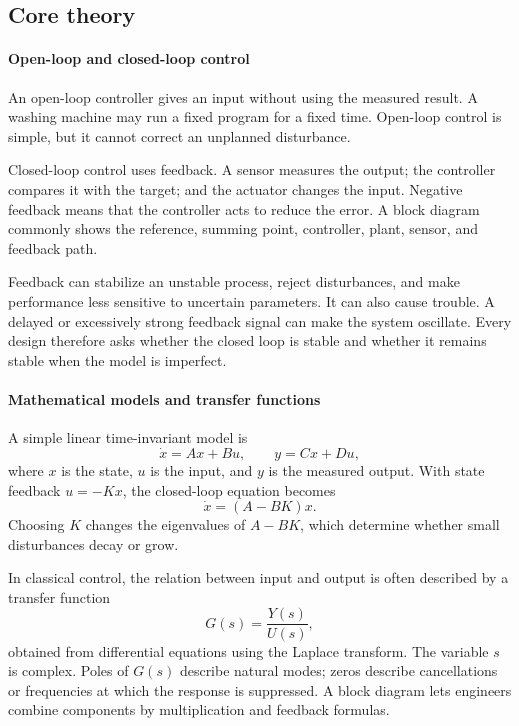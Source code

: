 \subsection*{Core theory}
\paragraph{Open-loop and closed-loop control}

An open-loop controller gives an input without using the measured result. A washing machine may run a fixed program for a fixed time. Open-loop control is simple, but it cannot correct an unplanned disturbance.

Closed-loop control uses feedback. A sensor measures the output; the controller compares it with the target; and the actuator changes the input. Negative feedback means that the controller acts to reduce the error. A block diagram commonly shows the reference, summing point, controller, plant, sensor, and feedback path.

Feedback can stabilize an unstable process, reject disturbances, and make performance less sensitive to uncertain parameters. It can also cause trouble. A delayed or excessively strong feedback signal can make the system oscillate. Every design therefore asks whether the closed loop is stable and whether it remains stable when the model is imperfect.

\paragraph{Mathematical models and transfer functions}

A simple linear time-invariant model is
\[
 \dot x=Ax+Bu,\qquad y=Cx+Du,
\]
where $x$ is the state, $u$ is the input, and $y$ is the measured output. With state feedback $u=-Kx$, the closed-loop equation becomes
\[
 \dot x=(A-BK)x.
\]
Choosing $K$ changes the eigenvalues of $A-BK$, which determine whether small disturbances decay or grow.

In classical control, the relation between input and output is often described by a transfer function
\[
 G(s)=\frac{Y(s)}{U(s)},
\]
obtained from differential equations using the Laplace transform. The variable $s$ is complex. Poles of $G(s)$ describe natural modes; zeros describe cancellations or frequencies at which the response is suppressed. A block diagram lets engineers combine components by multiplication and feedback formulas.

